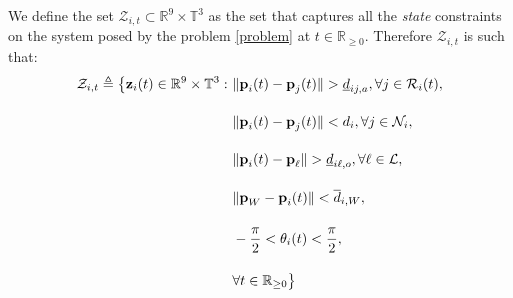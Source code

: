 We define the set $\mathcal{Z}_{i,t} \subset \mathbb{R}^{9} \times \mathbb{T}^3$
as the set that captures all the \textit{state} constraints on the system
posed by the problem \eqref{problem} at $t \in \mathbb{R}_{\geq 0}$.
Therefore $\mathcal{Z}_{i,t}$ is such that:
\begin{align}
  \mathcal{Z}_{i,t} \triangleq \big\{\bm{\mathbf{z}}_i(t) \in \mathbb{R}^{9}\times \mathbb{T}^3 : \
      & \|\bm{\mathbf{p}}_i(t) - \bm{\mathbf{p}}_j(t)\| > \underline{d}_{ij,a}, \forall j \in \mathcal{R}_i(t), \label{constraint:p_1}\\[2.5ex]
      & \|\bm{\mathbf{p}}_i(t) - \bm{\mathbf{p}}_j(t)\| < d_i, \forall j \in \mathcal{N}_i, \\[2.5ex]
      & \|\bm{\mathbf{p}}_i(t) - \bm{\mathbf{p}}_{\ell}\| > \underline{d}_{i\ell,o}, \forall \ell \in \mathcal{L}, \\[2.5ex]
      & \|\bm{\mathbf{p}}_W - \bm{\mathbf{p}}_i(t)\| < \overline{d}_{i,W}, \\[2.5ex]
      & - \frac{\pi}{2} < \theta_i(t) < \frac{\pi}{2} \label{constraint:p_5}, \\[2.5ex]
      &\forall t \in \mathbb{R}_{\geq 0}\big\}
\end{align}
